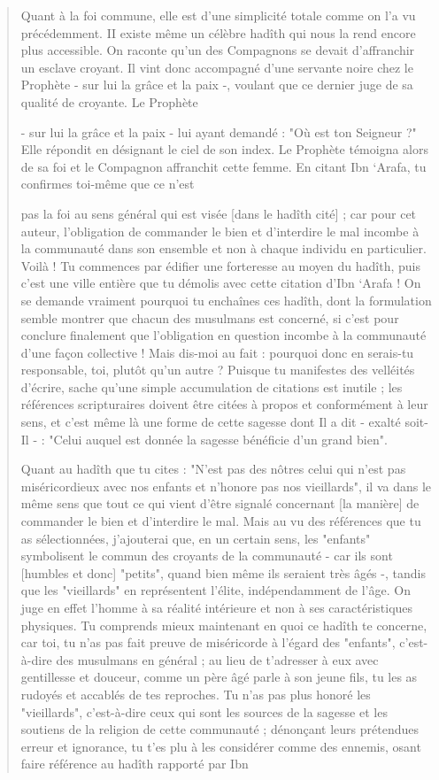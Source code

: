 \begin{quote}
Quant à la foi commune, elle est d'une simplicité totale comme on l'a vu
précédemment. II existe même un célèbre hadîth qui nous la rend encore
plus accessible. On raconte qu'un des Compagnons se devait d'affranchir
un esclave croyant. Il vint donc accompagné d'une servante noire chez le
Prophète - sur lui la grâce et la paix -, voulant que ce dernier juge de
sa qualité de croyante. Le Prophète

- sur lui la grâce et la paix - lui ayant demandé : "Où est ton Seigneur
?" Elle répondit en désignant le ciel de son index. Le Prophète témoigna
alors de sa foi et le Compagnon affranchit cette femme. En citant Ibn
`Arafa, tu confirmes toi-même que ce n'est

pas la foi au sens général qui est visée {[}dans le hadîth cité{]} ; car
pour cet auteur, l'obligation de commander le bien et d'interdire le mal
incombe à la communauté dans son ensemble et non à chaque individu en
particulier. Voilà ! Tu commences par édifier une forteresse au moyen du
hadîth, puis c'est une ville entière que tu démolis avec cette citation
d'Ibn `Arafa ! On se demande vraiment pourquoi tu enchaînes ces hadîth,
dont la formulation semble montrer que chacun des musulmans est
concerné, si c'est pour conclure finalement que l'obligation en question
incombe à la communauté d'une façon collective ! Mais dis-moi au fait :
pourquoi donc en serais-tu responsable, toi, plutôt qu'un autre ?
Puisque tu manifestes des velléités d'écrire, sache qu'une simple
accumulation de citations est inutile ; les références scripturaires
doivent être citées à propos et conformément à leur sens, et c'est même
là une forme de cette sagesse dont Il a dit - exalté soit-Il - : "Celui
auquel est donnée la sagesse bénéficie d'un grand bien".

Quant au hadîth que tu cites : "N'est pas des nôtres celui qui n'est pas
miséricordieux avec nos enfants et n'honore pas nos vieillards", il va
dans le même sens que tout ce qui vient d'être signalé concernant {[}la
manière{]} de commander le bien et d'interdire le mal. Mais au vu des
références que tu as sélectionnées, j'ajouterai que, en un certain sens,
les "enfants" symbolisent le commun des croyants de la communauté - car
ils sont {[}humbles et donc{]} "petits", quand bien même ils seraient
très âgés -, tandis que les "vieillards" en représentent l'élite,
indépendamment de l'âge. On juge en effet l'homme à sa réalité
intérieure et non à ses caractéristiques physiques. Tu comprends mieux
maintenant en quoi ce hadîth te concerne, car toi, tu n'as pas fait
preuve de miséricorde à l'égard des "enfants", c'est-à-dire des
musulmans en général ; au lieu de t'adresser à eux avec gentillesse et
douceur, comme un père âgé parle à son jeune fils, tu les as rudoyés et
accablés de tes reproches. Tu n'as pas plus honoré les "vieillards",
c'est-à-dire ceux qui sont les sources de la sagesse et les soutiens de
la religion de cette communauté ; dénonçant leurs prétendues erreur et
ignorance, tu t'es plu à les considérer comme des ennemis, osant faire
référence au hadîth rapporté par Ibn


\end{quote}

